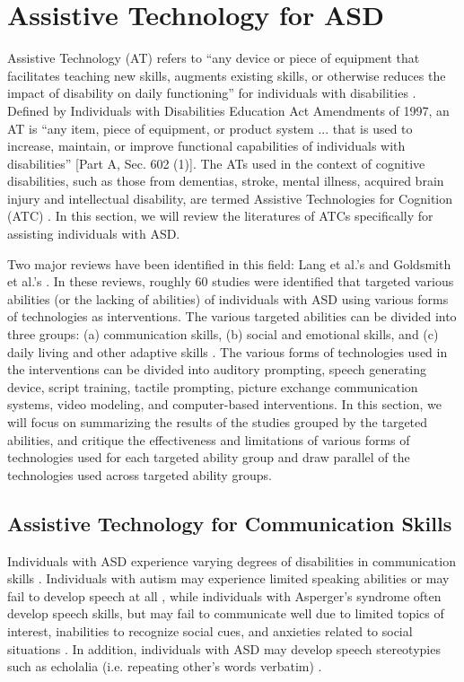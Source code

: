 \documentclass{ut-thesis}
\begin{document}
\section{Assistive Technology for ASD}
Assistive Technology (AT) refers to ``any device or piece of equipment that facilitates teaching new skills, augments existing skills, or otherwise reduces the impact of disability on daily functioning'' for individuals with disabilities \cite{lang2014assistive}.  Defined by Individuals with Disabilities Education Act Amendments of 1997, an AT is ``any item, piece of equipment, or product system ... that is used to increase, maintain, or improve functional capabilities of individuals with disabilities'' [Part A, Sec. 602 (1)].  The ATs used in the context of cognitive disabilities, such as those from dementias, stroke, mental illness, acquired brain injury and intellectual disability, are termed Assistive Technologies for Cognition (ATC) \cite{frank2004assistive}.  In this section, we will review the literatures of ATCs specifically for assisting individuals with ASD.

Two major reviews have been identified in this field: Lang et al.'s \cite{lang2014assistive} and Goldsmith et al.'s \cite{goldsmith2004use}.  In these reviews, roughly 60 studies were identified that targeted various abilities (or the lacking of abilities) of individuals with ASD using various forms of technologies as interventions.  The various targeted abilities can be divided into three groups: (a) communication skills, (b) social and emotional skills, and (c) daily living and other adaptive skills \cite{lang2014assistive}.  The various forms of technologies used in the interventions can be divided into auditory prompting, speech generating device, script training, tactile prompting, picture exchange communication systems, video modeling, and computer-based interventions.  In this section, we will focus on summarizing the results of the studies grouped by the targeted abilities, and critique the effectiveness and limitations of various forms of technologies used for each targeted ability group and draw parallel of the technologies used across targeted ability groups.

\subsection{Assistive Technology for Communication Skills}
Individuals with ASD experience varying degrees of disabilities in communication skills \cite{howlin2003outcome}.  Individuals with autism may experience limited speaking abilities or may fail to develop speech at all \cite{weitz1997aac}, while individuals with Asperger's syndrome often develop speech skills, but may fail to communicate well due to limited topics of interest, inabilities to recognize social cues, and anxieties related to social situations \cite{scheuermann2002teaching}.  In addition, individuals with ASD may develop speech stereotypies such as echolalia (i.e. repeating other's words verbatim) \cite{sigafoos2007assessing}.
\end{document}
